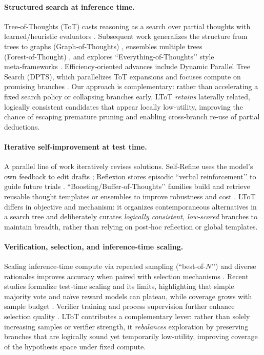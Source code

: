 \documentclass{article}
\begin{document}
\paragraph{Structured search at inference time.}
Tree‑of‑Thoughts (ToT) casts reasoning as a search over partial thoughts with learned/heuristic evaluators \citep{yao2023tot}. Subsequent work generalizes the structure from trees to graphs (Graph‑of‑Thoughts) \citep{besta2024got}, ensembles multiple trees (Forest‑of‑Thought) \citep{bi2024fot}, and explores “Everything‑of‑Thoughts’’ style meta‑frameworks \citep{ding2023xot}. Efficiency‑oriented advances include Dynamic Parallel Tree Search (DPTS), which parallelizes ToT expansions and focuses compute on promising branches \citep{ding2025dpts}. Our approach is complementary: rather than accelerating a fixed search policy or collapsing branches early, LToT \emph{retains} laterally related, logically consistent candidates that appear locally low‑utility, improving the chance of escaping premature pruning and enabling cross‑branch re‑use of partial deductions.

\paragraph{Iterative self‑improvement at test time.}
A parallel line of work iteratively revises solutions. Self‑Refine uses the model’s own feedback to edit drafts \citep{madaan2023selfrefine}; Reflexion stores episodic “verbal reinforcement’’ to guide future trials \citep{shinn2023reflexion}. “Boosting/Buffer‑of‑Thoughts’’ families build and retrieve reusable thought templates or ensembles to improve robustness and cost \citep{chen2024bot,yang2024bot}. LToT differs in objective and mechanism: it organizes contemporaneous alternatives in a search tree and deliberately curates \emph{logically consistent, low‑scored} branches to maintain breadth, rather than relying on post‑hoc reflection or global templates.

\paragraph{Verification, selection, and inference‑time scaling.}
Scaling inference‑time compute via repeated sampling (“best‑of-\(N\)’’) and diverse rationales improves accuracy when paired with selection mechanisms \citep{cobbe2021verifier,wang2022selfconsistency}. Recent studies formalize test‑time scaling and its limits, highlighting that simple majority vote and naïve reward models can plateau, while coverage grows with sample budget \citep{brown2024monkeys}. Verifier training and process supervision further enhance selection quality \citep{lightman2023verify,zhang2024generativeverifiers}. LToT contributes a complementary lever: rather than solely increasing samples or verifier strength, it \emph{rebalances} exploration by preserving branches that are logically sound yet temporarily low‑utility, improving coverage of the hypothesis space under fixed compute.
\end{document}
